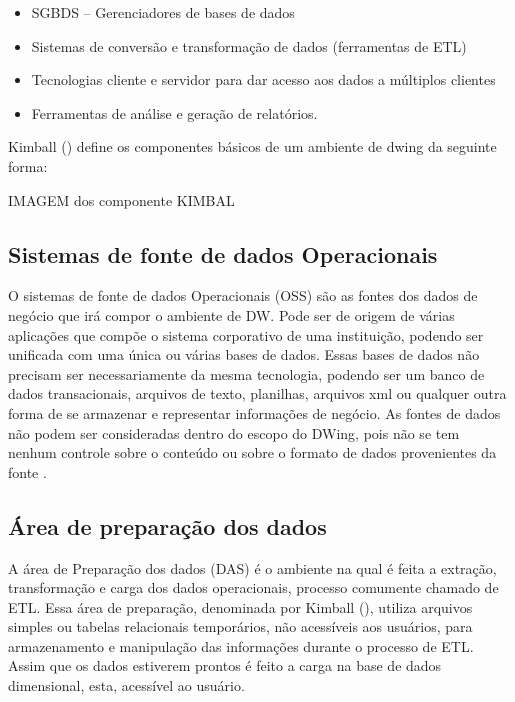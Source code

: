 %

\begin{itemize}
\item SGBDS – Gerenciadores de bases de dados
\item Sistemas de conversão e transformação de dados (ferramentas de ETL)
\item Tecnologias cliente e servidor para dar acesso aos dados a múltiplos clientes
\item Ferramentas de análise e geração de relatórios.
\end{itemize}

%

Kimball (\citeyear{kimball2002}) define os componentes básicos de um ambiente de dwing da seguinte forma:

IMAGEM dos componente KIMBAL

\subsection{Sistemas de fonte de dados Operacionais}

O sistemas de fonte de dados Operacionais (OSS) são as fontes dos dados de negócio que irá compor o ambiente de DW. Pode ser de origem de várias aplicações que compõe o sistema corporativo de uma instituição, podendo ser unificada com uma única ou várias bases de dados.  Essas bases de dados não precisam ser necessariamente da mesma tecnologia, podendo ser um banco de dados transacionais, arquivos de texto, planilhas, arquivos xml ou qualquer outra forma de se armazenar e representar informações de negócio. As fontes de dados não podem ser consideradas dentro do escopo do DWing, pois  não se tem nenhum controle sobre o conteúdo ou sobre o formato de dados provenientes da fonte \cite{kimball2002}.

\subsection{Área de preparação dos dados}

A área de Preparação dos dados (DAS) é o ambiente na qual é feita a extração, transformação e carga dos dados operacionais, processo comumente chamado de ETL. Essa área de preparação, denominada por Kimball (\citeyear{kimball2002}), utiliza arquivos simples ou tabelas relacionais temporários, não acessíveis aos usuários, para armazenamento e manipulação das informações durante o processo de ETL. Assim que os dados estiverem prontos é feito a carga na base de dados dimensional, esta, acessível ao usuário.

